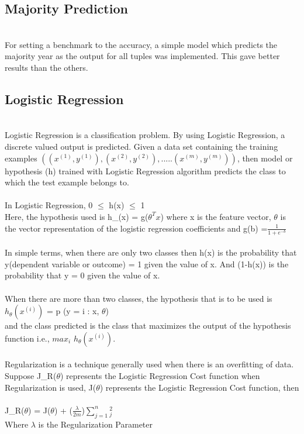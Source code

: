 \documentclass[10pt]{article}
\begin{document}
\subsection{Majority Prediction}
\\For setting a benchmark to the accuracy, a simple model which predicts the majority year as the output for all tuples was implemented. This gave better results than the others.
\subsection{Logistic Regression}
\\Logistic Regression is a classification problem. By using Logistic Regression, a discrete valued output is predicted. Given a data set containing the training examples $((x^{(1)}, y^{(1)}) , (x^{(2)}, y^{(2)}) ,.....(x^{(m)}, y^{(m)}))$, then model or hypothesis (h) trained with Logistic Regression algorithm predicts the class to which the test example belongs to.  \\
\\In Logistic Regression, 0 $\leq$  h(x) $\leq$ 1
\\Here, the hypothesis used is h_\theta(x) = g($\theta^T x$) where x is the feature vector, $\theta$ is the vector representation of the logistic regression coefficients and g(b) =$\frac{1}{1+e^{-b}}$\\
\\In simple terms, when there are only two classes then h(x) is the probability that y(dependent variable or outcome) = 1 given the value of x. And (1-h(x)) is the probability that y = 0 given the value of x.
\\\\When there are more than two classes, the hypothesis that is to be used is $h_{\theta} (x^{(i)})$ = p (y = i : x, {$\theta$})
\\and the class predicted is the class that maximizes the output of the hypothesis function i.e., $max_{i}$ $h_{\theta} (x^{(i)})$.\\
\\Regularization is a technique generally used when there is an overfitting of data. Suppose J_R($\theta$) represents the Logistic Regression Cost function when Regularization is used, J($\theta$)  represents the Logistic Regression Cost function, then\\
\\J_R($\theta$) = J($\theta$) + ($\frac{\lambda}{2m}$)$\sum\limits_{j=1}^n $\theta$_j^2$
\\Where $\lambda$ is the Regularization Parameter\\
\end{document}
